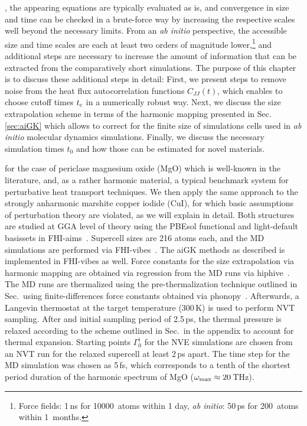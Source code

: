 , the appearing equations are typically evaluated as is, and convergence in size and time can be checked in a brute-force way by increasing the respective scales well beyond the necessary limits. From an \emph{ab initio} perspective, the accessible size and time scales are each at least two orders of magnitude lower,\footnote{Force fields: 1\,ns for 10000~atoms within 1 day, \emph{ab initio}: 50\,ps for 200~atoms within 1~months.} and additional steps are necessary to increase the amount of information that can be extracted from the comparatively short simulations. The purpose of this chapter is to discuss these additional steps in detail: First, we present steps to remove noise from the heat flux autocorrelation functions $C_{JJ} (t)$, which enables to choose cutoff times $t_{\rm c}$ in a numerically robust way. Next, we discuss the size extrapolation scheme in terms of the harmonic mapping presented in Sec.\,\ref{sec:aiGK} which allows to correct for the finite size of simulations cells used in \emph{ab initio} molecular dynamics simulations. Finally, we discuss the necessary simulation times $t_0$ and how those can be estimated for novel materials.

 for the case of periclase magnesium oxide (MgO) which is well-known in the literature, and, as a rather harmonic material, a typical benchmark system for perturbative heat transport techniques. We then apply the same approach to the strongly anharmonic marshite copper iodide (CuI), for which basic assumptions of perturbation theory are violated, as we will explain in detail. 
Both structures are studied at GGA level of theory using the PBEsol functional and light-default basissets in FHI-aims~. Supercell sizes are 216 atoms each, and the MD simulations are performed via FHI-vibes~. The aiGK methods as described is implemented in FHI-vibes as well. Force constants for the size extrapolation via harmonic mapping are obtained via regression from the MD runs via hiphive~. The MD runs are thermalized using the pre-thermalization technique outlined in Sec.\, using finite-differences force constants obtained via phonopy~. Afterwards, a Langevin thermostat at the target temperature (300\,K) is used to perform NVT sampling. After and initial sampling period of 2.5\,ps, the thermal pressure is relaxed according to the scheme outlined in Sec.\, in the appendix to account for thermal expansion. Starting points $\Gamma^i_0$ for the NVE simulations are chosen from an NVT run for the relaxed supercell at least 2\,ps apart. The time step for the MD simulation was chosen as 5\,fs, which corresponds to a tenth of the shortest period duration of the harmonic spectrum of MgO ($\omega_{\rm max} \approx 20$\,THz).


